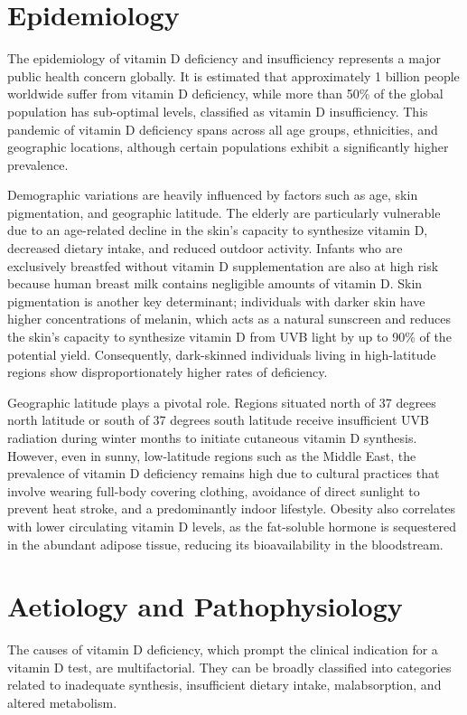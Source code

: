 \section*{Epidemiology}
The epidemiology of vitamin D deficiency and insufficiency represents a major public health concern globally. It is estimated that approximately 1 billion people worldwide suffer from vitamin D deficiency, while more than 50\% of the global population has sub-optimal levels, classified as vitamin D insufficiency. This pandemic of vitamin D deficiency spans across all age groups, ethnicities, and geographic locations, although certain populations exhibit a significantly higher prevalence.

Demographic variations are heavily influenced by factors such as age, skin pigmentation, and geographic latitude. The elderly are particularly vulnerable due to an age-related decline in the skin's capacity to synthesize vitamin D, decreased dietary intake, and reduced outdoor activity. Infants who are exclusively breastfed without vitamin D supplementation are also at high risk because human breast milk contains negligible amounts of vitamin D. Skin pigmentation is another key determinant; individuals with darker skin have higher concentrations of melanin, which acts as a natural sunscreen and reduces the skin's capacity to synthesize vitamin D from UVB light by up to 90\% of the potential yield. Consequently, dark-skinned individuals living in high-latitude regions show disproportionately higher rates of deficiency.

Geographic latitude plays a pivotal role. Regions situated north of 37 degrees north latitude or south of 37 degrees south latitude receive insufficient UVB radiation during winter months to initiate cutaneous vitamin D synthesis. However, even in sunny, low-latitude regions such as the Middle East, the prevalence of vitamin D deficiency remains high due to cultural practices that involve wearing full-body covering clothing, avoidance of direct sunlight to prevent heat stroke, and a predominantly indoor lifestyle. Obesity also correlates with lower circulating vitamin D levels, as the fat-soluble hormone is sequestered in the abundant adipose tissue, reducing its bioavailability in the bloodstream.

\section*{Aetiology and Pathophysiology}
The causes of vitamin D deficiency, which prompt the clinical indication for a vitamin D test, are multifactorial. They can be broadly classified into categories related to inadequate synthesis, insufficient dietary intake, malabsorption, and altered metabolism.

